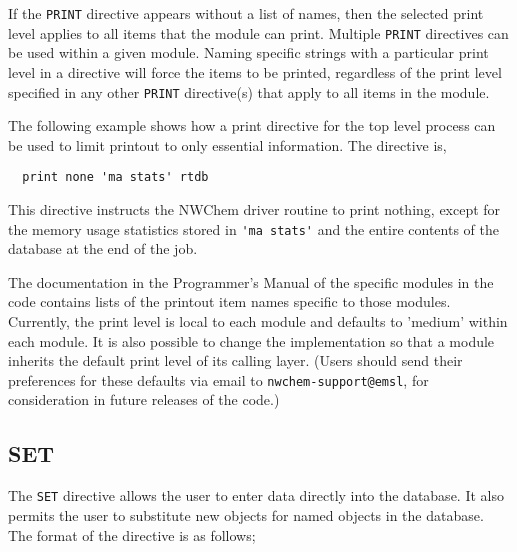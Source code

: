 If the \verb+PRINT+ directive appears without a list of names, then the
selected print level applies to all items that the module can print.
Multiple \verb+PRINT+ directives can be used within a given module.  Naming
specific strings with a particular print level in a directive will force the
items to be printed, regardless of the print level specified in any other 
\verb+PRINT+ directive(s) that apply to all items in the module.

   

The following example shows how a print directive for the top level process 
can be used to limit printout to only essential information.
The directive is,

\begin{verbatim}
  print none 'ma stats' rtdb
\end{verbatim}

This directive instructs the NWChem driver routine to print nothing, except
for the memory usage statistics stored in \verb+'ma stats'+ and the entire 
contents of the database at the end of the job. 

The documentation in the Programmer's Manual of the specific modules 
in the code contains lists of the printout item names specific
to those modules.  Currently, the print level is local to each module
and defaults to 'medium' within each module.  It is also possible to
change the implementation so that a module inherits the default print level 
of its calling layer.  (Users should send their preferences for these
defaults via email to \verb+nwchem-support@emsl+, for consideration in
future releases of the code.)

\subsection{SET}
\label{sec:set}

The \verb+SET+ directive allows the user to enter data directly into the
database.  It also permits the user to substitute new objects for named
objects in the database.  The format of the directive is
as follows;

